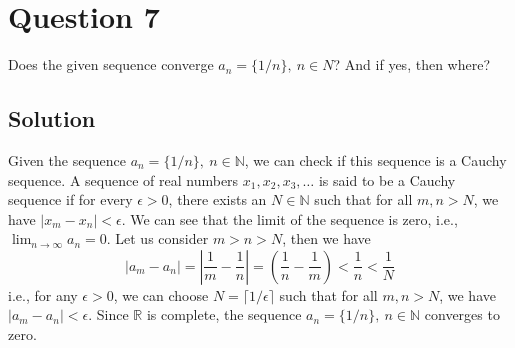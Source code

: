 \section*{Question 7}\label{sec:q7}

Does the given sequence converge \( a_{n} = \{1 / n\}, \ n \in N \)?
And if yes, then where?

\subsection*{Solution}

Given the sequence \( a_{n} = \{1 / n\}, \ n \in \mathbb{N} \), we can check if this sequence is a Cauchy sequence.
A sequence of real numbers \( x_1, x_2, x_3, \dots \) is said to be a Cauchy sequence if for every \( \epsilon > 0 \), there exists an \( N \in \mathbb{N} \) such that for all \( m, n > N \), we have \( \vert x_m - x_n \vert < \epsilon \).
We can see that the limit of the sequence is zero, i.e., \( \lim_{n \to \infty} a_n = 0 \).
Let us consider \( m > n > N \), then we have
\[
    \vert a_m - a_n \vert
    = \left\vert \frac{1}{m} - \frac{1}{n} \right\vert
    = \left( \frac{1}{n} - \frac{1}{m} \right)
    < \frac{1}{n}
    < \frac{1}{N}
\]
i.e., for any \( \epsilon > 0 \), we can choose \( N = \lceil 1/\epsilon \rceil \) such that for all \( m, n > N \), we have \( \vert a_m - a_n \vert < \epsilon \).
Since \( \mathbb{R} \) is complete, the sequence \( a_n = \{1 / n\}, \ n \in \mathbb{N} \) converges to zero.
